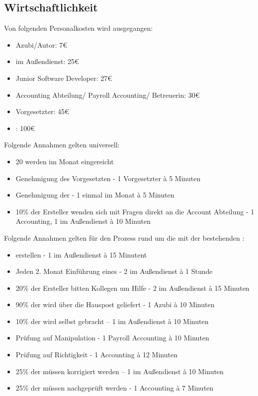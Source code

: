 \subsection{Wirtschaftlichkeit}

Von folgenden Personalkosten wird ausgegangen:
\begin{itemize}
\item Azubi/Autor: 7€
\item {} im Außendienst: 25€
\item Junior Software Developer: 27€ 
\item Accounting Abteilung/ Payroll Accounting/ Betreuerin: 30€
\item Vorgesetzter: 45€
\item {}: 100€
\end{itemize}

Folgende Annahmen gelten universell:
\begin{itemize}
\item 20  werden im Monat eingereicht
\item Genehmigung des Vorgesetzten - 1 Vorgesetzter à 5 Minuten
\item Genehmigung der  - 1  einmal im Monat à 5 Minuten
\item 10\% der Ersteller wenden sich mit Fragen direkt an die Account Abteilung - 1  Accounting, 1  im Außendienst à 10 Minuten
\end{itemize}

Folgende Annahmen gelten für den Prozess rund um die  mit der bestehenden :
\begin{itemize}
\item {} erstellen - 1  im Außendienst à 15 Minutent
\item Jeden 2. Monat Einführung eines  - 2  im Außendienst à 1 Stunde
\item 20\% der Ersteller bitten Kollegen um Hilfe - 2  im Außendienst à 15 Minuten
\item 90\% der  wird über die Hauspost geliefert - 1 Azubi à 10 Minuten
\item 10\% der  wird selbst gebracht – 1  im Außendienst à 10 Minuten
\item Prüfung auf Manipulation - 1  Payroll Accounting à 10 Minuten
\item Prüfung auf Richtigkeit - 1  Accounting à 12 Minuten
\item 25\% der  müssen korrigiert werden – 1  im Außendienst à 10 Minuten
\item 25\% der  müssen nachgeprüft werden - 1  Accounting à 7 Minuten
\end{itemize}

